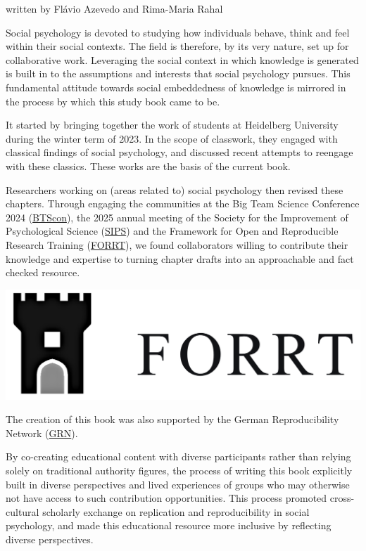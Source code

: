 \documentclass[
  letterpaper,
]{book}
\begin{document}
{written by Flávio Azevedo and Rima-Maria Rahal}

Social psychology is devoted to studying how individuals behave, think
and feel within their social contexts. The field is therefore, by its
very nature, set up for collaborative work. Leveraging the social
context in which knowledge is generated is built in to the assumptions
and interests that social psychology pursues. This fundamental attitude
towards social embeddedness of knowledge is mirrored in the process by
which this study book came to be.

It started by bringing together the work of students at Heidelberg
University during the winter term of 2023. In the scope of classwork,
they engaged with classical findings of social psychology, and discussed
recent attempts to reengage with these classics. These works are the
basis of the current book.

Researchers working on (areas related to) social psychology then revised
these chapters. Through engaging the communities at the Big Team Science
Conference 2024
(\href{https://bigteamscienceconference.github.io}{BTScon}), the 2025
annual meeting of the Society for the Improvement of Psychological
Science (\href{http://improvingpsych.org}{SIPS}) and the Framework for
Open and Reproducible Research Training
(\href{https://forrt.org}{FORRT}), we found collaborators willing to
contribute their knowledge and expertise to turning chapter drafts into
an approachable and fact checked resource.

\includegraphics{FORRT.png}

The creation of this book was also supported by the German
Reproducibility Network (\href{https://reproducibilitynetwork.de}{GRN}).

By co-creating educational content with diverse participants rather than
relying solely on traditional authority figures, the process of writing
this book explicitly built in diverse perspectives and lived experiences
of groups who may otherwise not have access to such contribution
opportunities. This process promoted cross-cultural scholarly exchange
on replication and reproducibility in social psychology, and made this
educational resource more inclusive by reflecting diverse perspectives.
\end{document}
